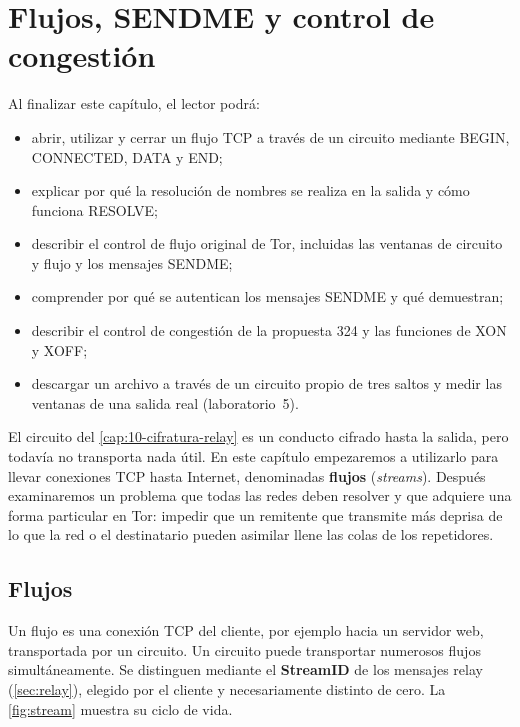 \chapter{Flujos, SENDME y control de congestión}\label{cap:11-stream}

\begin{obiettivi}
Al finalizar este capítulo, el lector podrá:
\begin{itemize}[nosep]
  \item abrir, utilizar y cerrar un flujo TCP a través de un circuito mediante BEGIN, CONNECTED, DATA y END;
  \item explicar por qué la resolución de nombres se realiza en la salida y cómo funciona RESOLVE;
  \item describir el control de flujo original de Tor, incluidas las ventanas de circuito y flujo y los mensajes SENDME;
  \item comprender por qué se autentican los mensajes SENDME y qué demuestran;
  \item describir el control de congestión de la propuesta 324 y las funciones de XON y XOFF;
  \item descargar un archivo a través de un circuito propio de tres saltos y medir las ventanas de una salida real (laboratorio~5).
\end{itemize}
\end{obiettivi}

El circuito del \cref{cap:10-cifratura-relay} es un conducto cifrado hasta la salida, pero todavía no transporta nada útil. En este capítulo empezaremos a utilizarlo para llevar conexiones TCP hasta Internet, denominadas \textbf{flujos} (\emph{streams}). Después examinaremos un problema que todas las redes deben resolver y que adquiere una forma particular en Tor: impedir que un remitente que transmite más deprisa de lo que la red o el destinatario pueden asimilar llene las colas de los repetidores.

\section{Flujos}\label{sec:stream}

Un flujo es una conexión TCP del cliente, por ejemplo hacia un servidor web, transportada por un circuito. Un circuito puede transportar numerosos flujos simultáneamente. Se distinguen mediante el \textbf{StreamID} de los mensajes relay (\cref{sec:relay}), elegido por el cliente y necesariamente distinto de cero. La \cref{fig:stream} muestra su ciclo de vida.


